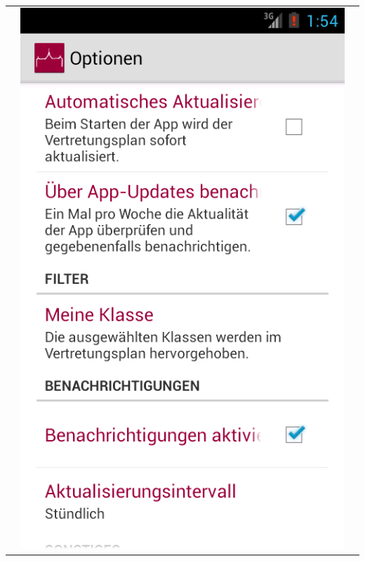 \documentclass[12pt,headsepline]{scrartcl}
\begin{document}
\begin{center}
\begin{longtable}{p{5cm}p{5cm}p{5cm}}
&
\includegraphics[scale=0.28,keepaspectratio=true]{device-2013-01-16-103407.png}
&

\end{longtable}
\end{center}
\end{document}
